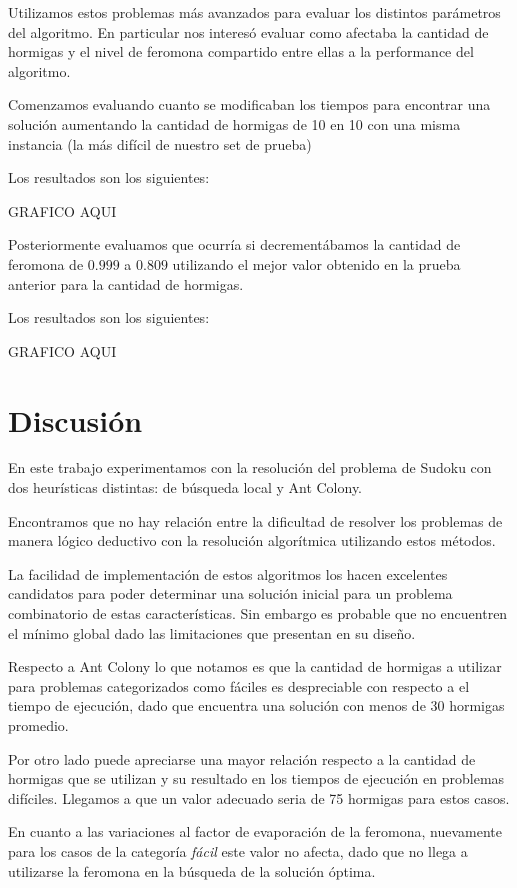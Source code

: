 \documentclass[a4paper,spanish]{article}
\begin{document}
Utilizamos estos problemas más avanzados para evaluar los distintos parámetros del algoritmo.
En particular nos interesó evaluar como afectaba la cantidad de hormigas y el nivel de feromona
compartido entre ellas a la performance del algoritmo.

Comenzamos evaluando cuanto se modificaban los tiempos para encontrar una solución aumentando 
la cantidad de hormigas de 10 en 10 con una misma instancia (la más difícil de nuestro set de prueba)

Los resultados son los siguientes:

GRAFICO AQUI

Posteriormente evaluamos que ocurría si decrementábamos la cantidad de feromona de $0.999$ a
$0.809$ utilizando el mejor valor obtenido en la prueba anterior para la cantidad de hormigas.

Los resultados son los siguientes:

GRAFICO AQUI


\section{Discusión}

En este trabajo experimentamos con la resolución del problema de Sudoku con dos
heurísticas distintas: de búsqueda local y Ant Colony.

Encontramos que no hay relación entre la dificultad de resolver los problemas de
manera lógico deductivo con la resolución algorítmica utilizando estos métodos.

La facilidad de implementación de estos algoritmos los hacen excelentes
candidatos para poder determinar una solución inicial para un problema
combinatorio de estas características. Sin embargo es probable que no encuentren
el mínimo global dado las limitaciones que presentan en su diseño.


Respecto a Ant Colony lo que notamos es que la cantidad de hormigas a utilizar para
problemas categorizados como fáciles es despreciable con respecto a el tiempo de ejecución,
dado que encuentra una solución con menos de 30 hormigas promedio.

Por otro lado puede apreciarse una mayor relación respecto a la cantidad de hormigas que se 
utilizan y su resultado en los tiempos de ejecución en problemas difíciles. Llegamos a que
un valor adecuado seria de 75 hormigas para estos casos.

En cuanto a las variaciones al factor de evaporación de la feromona, nuevamente para los
casos de la categoría \emph{fácil} este valor no afecta, dado que no llega a utilizarse la
feromona en la búsqueda de la solución óptima.
\end{document}
